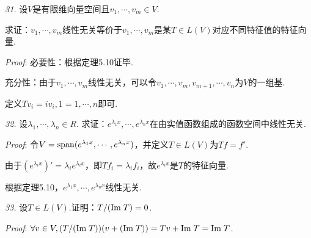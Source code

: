 \textit{31.}
设\(V\)是有限维向量空间且\(v_1,\cdots,v_m \in V\).

求证：\(v_1,\cdots,v_m\)线性无关等价于\(v_1,\cdots,v_m\)是某\(T \in L(V)\)对应不同特征值的特征向量.

\textit{Proof}:
必要性：根据定理5.10证毕.

充分性：由于\(v_1,\cdots,v_m\)线性无关，可以令\(v_1,\cdots,v_m,v_{m+1},\cdots,v_n\)为\(V\)的一组基.

定义\(Tv_i=iv_i,1=1,\cdots,n\)即可.

\hspace*{\fill}

\textit{32.}
设\(\lambda_1,\cdots,\lambda_n \in R\).
求证：\(e^{\lambda_1 x},\cdots,e^{\lambda_n x}\)在由实值函数组成的函数空间中线性无关.

\textit{Proof}:
令\(V=\mathrm{span} (e^{\lambda_1 x},\cdots,e^{\lambda_n x})\)，并定义\(T \in L(V)\)为\(Tf=f'\).

由于\((e^{\lambda_i x})'=\lambda_i e^{\lambda_i x}\)，即\(Tf_i=\lambda_i f_i\)，故\(e^{\lambda_i x}\)是\(T\)的特征向量.

根据定理5.10，\(e^{\lambda_1 x},\cdots,e^{\lambda_n x}\)线性无关.

\hspace*{\fill}

\textit{33.}
设\(T \in L(V)\).证明：\(T/(\mathrm{Im \;} T)=0\).

\textit{Proof}:
\(\forall v \in V,(T/(\mathrm{Im \;} T))(v+(\mathrm{Im \;} T))=Tv+\mathrm{Im \;} T=\mathrm{Im \;} T\).

